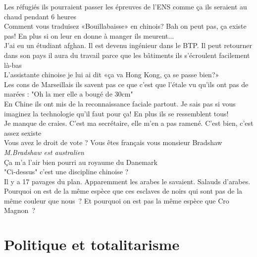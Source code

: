 \documentclass[french, a4paper, openany]{book}
\begin{document}
	\noindent \og Les réfugiés ils pourraient passer les épreuves de l'ENS comme ça ils seraient au chaud pendant 6 heures \fg \\
	\og Comment vous traduisez «Bouillabaisse» en chinois? Bah on peut pas, ça existe pas! En plus si on leur en donne à manger ils meurent... \fg \\
	\og J'ai eu un étudiant afghan. Il est devenu ingénieur dans le BTP. Il peut retourner dans son pays il aura du travail parce que les bâtiments ils s'écroulent facilement là-bas \fg \\
	\og L'assistante chinoise je lui ai dit «ça va Hong Kong, ça se passe bien?» \fg \\
	\og Les cons de Marseillais ils savent pas ce que c'est que l'étale vu qu'ils ont pas de marées : "Oh la mer elle a bougé de 30cm" \fg \\
	\og En Chine ils ont mis de la reconnaissance faciale partout. Je sais pas si vous imaginez la technologie qu'il faut pour ça! En plus ils se ressemblent tous! \fg \\
	\og Je manque de craies. C'est ma secrétaire, elle m'en a pas ramené. C'est bien, c'est assez sexiste \fg \\
	\og Vous avez le droit de vote ? Vous êtes français vous monsieur Bradshaw \fg \emph{M.Bradshaw est australien} \\
	\og Ça m'a l'air bien pourri au royaume du Danemark \fg \\
	\og "Ci-dessus" c'est une discipline chinoise ? \fg \\
	\og Il y a 17 pavages du plan. Apparemment les arabes le savaient. Salauds d'arabes. \fg \\
	\og Pourquoi on est de la même espèce que ces esclaves de noirs qui sont pas de la même couleur que nous~? Et pourquoi on est pas la même espèce que Cro Magnon~? \fg \\

\section{Politique et totalitarisme}
\end{document}
